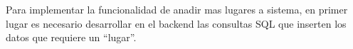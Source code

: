 Para implementar la funcionalidad de anadir mas lugares a sistema, en primer lugar es necesario desarrollar en el backend las consultas SQL que inserten los datos que requiere un ``lugar''.\\
